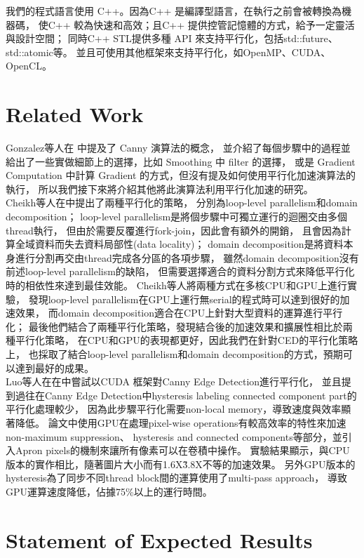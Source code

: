 \documentclass[sigconf,nonacm]{acmart}
\begin{document}
我們的程式語言使用 C++。因為C++ 是編譯型語言，在執行之前會被轉換為機器碼，
使C++ 較為快速和高效；且C++ 提供控管記憶體的方式，給予一定靈活與設計空間；
同時C++ STL提供多種 API 來支持平行化，包括std::future、std::atomic等。
並且可使用其他框架來支持平行化，如OpenMP、CUDA、OpenCL。

\section{Related Work}

Gonzalez等人在 \cite{gonzalez2018digital} 中提及了 Canny 演算法的概念，
並介紹了每個步驟中的過程並給出了一些實做細節上的選擇，比如 Smoothing 中 filter 的選擇，
或是 Gradient Computation 中計算 Gradient 的方式，但沒有提及如何使用平行化加速演算法的執行，
所以我們接下來將介紹其他將此演算法利用平行化加速的研究。\\
Cheikh等人在\cite{6328953}中提出了兩種平行化的策略，
分別為loop-level parallelism和domain decomposition；
loop-level parallelism是將個步驟中可獨立運行的迴圈交由多個thread執行，
但由於需要反覆進行fork-join，因此會有額外的開銷，
且會因為計算全域資料而失去資料局部性(data locality)；
domain decomposition是將資料本身進行分割再交由thread完成各分區的各項步驟，
雖然domain decomposition沒有前述loop-level parallelism的缺陷，
但需要選擇適合的資料分割方式來降低平行化時的相依性來達到最佳效能。
Cheikh等人將兩種方式在多核CPU和GPU上進行實驗，
發現loop-level parallelism在GPU上運行無serial的程式時可以達到很好的加速效果，
而domain decomposition適合在CPU上針對大型資料的運算進行平行化；
最後他們結合了兩種平行化策略，發現結合後的加速效果和擴展性相比於兩種平行化策略，
在CPU和GPU的表現都更好，因此我們在針對CED的平行化策略上，
也採取了結合loop-level parallelism和domain decomposition的方式，預期可以達到最好的成果。 \\
Luo等人在在\cite{4563088}中嘗試以CUDA 框架對Canny Edge Detection進行平行化，
並且提到過往在Canny Edge Detection中hysteresis labeling connected component part的平行化處理較少，
因為此步驟平行化需要non-local memory，導致速度與效率顯著降低。
論文中使用GPU在處理pixel-wise operations有較高效率的特性來加速non-maximum suppression、
hysteresis and connected components等部分，並引入Apron pixels的機制來讓所有像素可以在卷積中操作。
實驗結果顯示，與CPU版本的實作相比，隨著圖片大小而有1.6X\~3.8X不等的加速效果。
另外GPU版本的hysteresis為了同步不同thread block間的運算使用了multi-pass approach，
導致GPU運算速度降低，佔據75\%以上的運行時間。

\section{Statement of Expected Results}
\end{document}
